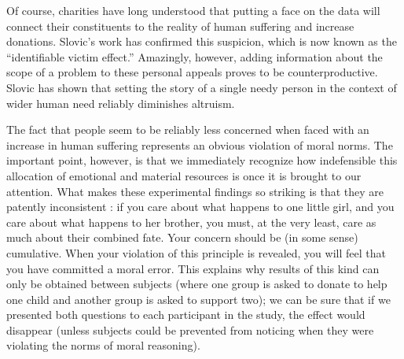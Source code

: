\documentclass[a4paper,14pt]{extarticle}
\begin{document}
Of course, charities have long understood that putting a face on the data will connect their constituents to the reality of human suffering and increase donations.
Slovic's work has confirmed this suspicion, which is now known as the ``identifiable victim effect.''
Amazingly, however, adding information about the scope of a problem to these personal appeals proves to be counterproductive.
Slovic has shown that setting the story of a single needy person in the context of wider human need reliably diminishes altruism.

The fact that people seem to be reliably less concerned when faced with an increase in human suffering represents an obvious violation of moral norms.
The important point, however, is that we immediately recognize how indefensible this allocation of emotional and material resources is once it is brought to our attention.
What makes these experimental findings so striking is that they are patently inconsistent :
if you care about what happens to one little girl, and you care about what happens to her brother, you must, at the very least, care as much about their combined fate.
Your concern should be (in some sense) cumulative.
When your violation of this principle is revealed, you will feel that you have committed a moral error.
This explains why results of this kind can only be obtained between subjects (where one group is asked to donate to help one child and another group is asked to support two);
we can be sure that if we presented both questions to each participant in the study, the effect would disappear (unless subjects could be prevented from noticing when they were violating the norms of moral reasoning).
\end{document}
